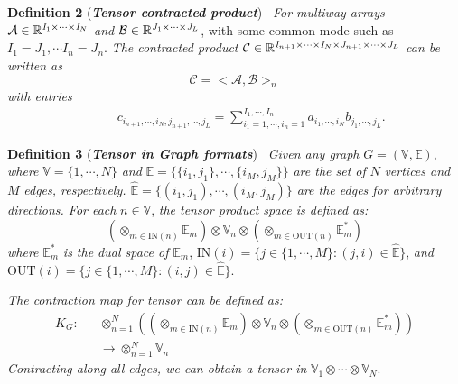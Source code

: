 \documentclass{article}
\begin{document}
\textbf{Definition 2} (\emph{\textbf{Tensor contracted  product}})~\cite{bibid}
\emph{For multiway arrays} $\mathcal{A} \in \mathbb{R}^{\emph{I}_1\times \cdots\times \emph{I}_N}$ \emph{and} $\mathcal{B} \in \mathbb{R}^{\emph{J}_1\times\cdots\times \emph{J}_L}$, with some common mode such as $I_{1}=J_{1},\cdots I_{n}=J_{n}$. \emph{The contracted product} $\mathcal{C} \in \mathbb{R}^{\emph{I}_{n+1}\times \cdots\times \emph{I}_N\times \emph{J}_{n+1}\times \cdots\times \emph{J}_L}$ \emph{can be written as}
\begin{equation}
\mathcal{C}=<\mathcal{A},\mathcal{B}>_n\nonumber
\end{equation}
\emph{	with entries}
\begin{eqnarray}
&\quad& c_{i_{n+1},\cdots,i_N,j_{n+1},\cdots,j_L}\nonumber
=\sum_{i_1=1,\cdots, i_n=1}^{I_1,\cdots,I_n}a_{i_1,\cdots,i_N}b_{j_1,\cdots,j_L}\nonumber.
\end{eqnarray}	

\textbf{Definition 3} (\emph{\textbf{Tensor in Graph formats}})~\cite{bibid}
\emph{Given any graph} $G=(\mathbb{V},\mathbb{E})$, \emph{where} $\mathbb{V}=\{1,\cdots,N\}$ \emph{and} $\mathbb{E}=\{\{i_{1},j_{1}\},\cdots,\{i_{M},j_{M}\}\}$ \emph{are the set of} $N$ \emph{vertices and} $M$ \emph{edges, respectively. $\hat{\mathbb{E}}=\{(i_{1},j_{1}),\cdots,(i_{M},j_{M})\}$ are the edges for arbitrary directions. For each} $n\in\mathbb{V}$, \emph{the tensor product space is defined as:}
\begin{equation*}
(\otimes_{m\in \text{IN}(n)}\mathbb{E}_{m})\otimes\mathbb{V}_{n}\otimes(\otimes_{m\in \text{OUT}(n)}\mathbb{E}_{m}^{*})
\end{equation*}
\emph{where} $\mathbb{E}_{m}^{*}$ \emph{is the dual space of} $\mathbb{E}_{m}$,  $\text{IN}(i)=\{j\in\{1,\cdots,M\}:(j,i)\in\hat{\mathbb{E}}\}$, \emph{and} $\text{OUT}(i)=\{j\in\{1,\cdots,M\}:(i,j)\in\hat{\mathbb{E}}\}$.

\emph{The contraction map for tensor can be defined as:}
\begin{eqnarray}
K_{G}:&&\otimes_{n=1}^{N}((\otimes_{m\in \text{IN}(n)}\mathbb{E}_{m})\otimes\mathbb{V}_{n}\otimes(\otimes_{m\in \text{OUT}(n)}\mathbb{E}_{m}^{*}))\nonumber\\
&&\rightarrow \otimes_{n=1}^{N} \mathbb{V}_{n}\nonumber
\end{eqnarray}
\emph{Contracting along all edges, we can obtain a tensor in}
$\mathbb{V}_{1}\otimes\cdots\otimes\mathbb{V}_{N}$.
\end{document}

